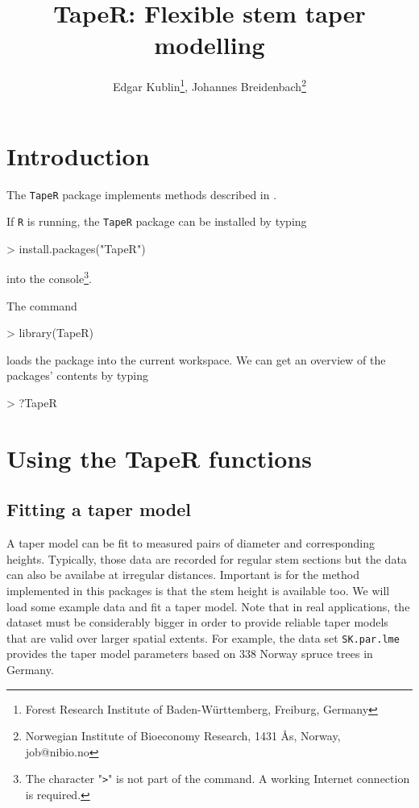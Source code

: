 \documentclass[english,11pt]{article}
\title{TapeR: Flexible stem taper modelling}
\author{Edgar Kublin\thanks{Forest Research Institute of
    Baden-W{\"u}rttemberg, Freiburg, Germany}, Johannes Breidenbach\thanks{Norwegian Institute of Bioeconomy Research, 1431 {\AA}s, Norway, job@nibio.no}}
\begin{document}

\maketitle



\section{Introduction}
The \texttt{TapeR} package implements methods described in \citep{kublin2013}.

If \texttt{R} is running, the \texttt{TapeR} package can be installed
by typing

\begin{Schunk}
\begin{Sinput}
> install.packages("TapeR")
\end{Sinput}
\end{Schunk}
into the console\footnote{The character "\texttt{>}" is not
  part of the command. A working Internet connection is required.}.

The command
\begin{Schunk}
\begin{Sinput}
> library(TapeR)
\end{Sinput}
\end{Schunk}
loads the package into the current workspace. We can get an overview of
the packages' contents by typing
\begin{Schunk}
\begin{Sinput}
> ?TapeR
\end{Sinput}
\end{Schunk}

\section{Using the TapeR functions}

\subsection{Fitting a taper model}

A taper model can be fit to measured pairs of diameter and
corresponding heights. Typically, those data are recorded for regular stem sections but
the data can also be availabe at irregular distances. Important is for
the method implemented in this packages is
that the stem height is available too. We will load some example data
and fit a taper model. Note that in real applications, the dataset must be
considerably bigger in order to provide reliable taper models that are
valid over larger spatial extents. For example, the data set
\texttt{SK.par.lme} provides the taper model parameters
based on 338 Norway spruce trees in Germany.
\end{document}
